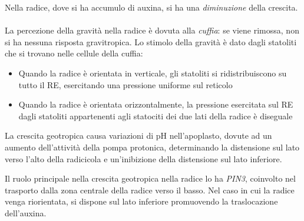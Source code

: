 \documentclass[a4paper,12pt]{book}
\begin{document}
Nella radice, dove si ha accumulo di auxina, si ha una \emph{diminuzione} della crescita. 

\paragraph{}
La percezione della gravità nella radice è dovuta alla \emph{cuffia}: se viene rimossa, non si ha nessuna risposta gravitropica. Lo stimolo della gravità è dato dagli statoliti che si trovano nelle cellule della cuffia:
\begin{itemize}
\item{ Quando la radice è orientata in verticale, gli statoliti si
ridistribuiscono su tutto il RE, esercitando una pressione
uniforme sul reticolo}
\item{ Quando la radice è orientata orizzontalmente, la pressione
esercitata sul RE dagli statoliti appartenenti agli statociti dei
due lati della radice è diseguale}
\end{itemize}
La crescita geotropica causa variazioni di pH nell'apoplasto, dovute ad un aumento dell'attività della pompa protonica, determinando la distensione sul lato verso l'alto della radicicola e un'inibizione della distensione sul lato inferiore.

Il ruolo principale nella crescita geotropica nella radice lo ha \emph{PIN3}, coinvolto nel trasporto dalla zona centrale della radice verso il basso. Nel caso in cui la radice venga riorientata, si dispone sul lato inferiore promuovendo la traslocazione dell'auxina.
\end{document}
